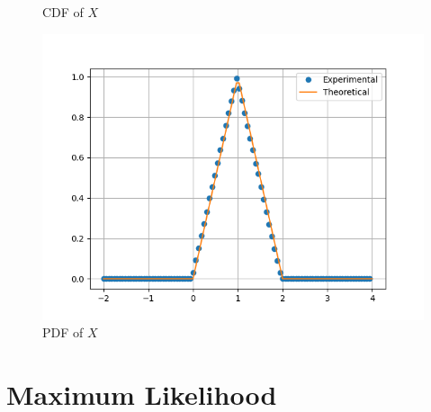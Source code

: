 \documentclass[journal, 12pt, twocolumn]{IEEEtran}
\begin{document}
\begin{enumerate}[label=\arabic{section}.\arabic*]
\begin{figure}[!ht]
            \caption{CDF of $X$}
            \label{fig:cdf_tri}
        \end{figure}
        \begin{figure}[!ht]
            \includegraphics[width=\columnwidth]{figs/pdf_tri.png}
            \caption{PDF of $X$}
            \label{fig:pdf_tri}
        \end{figure}

\end{enumerate}

\section{Maximum Likelihood}
\end{document}
